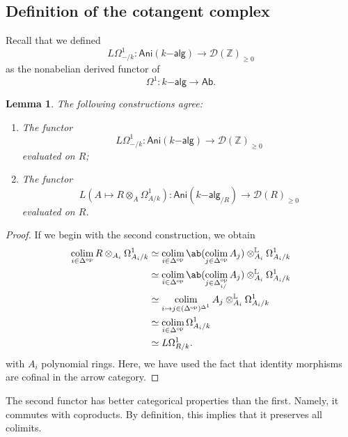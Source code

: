 \documentclass[10pt]{amsart}
\newtheorem{lem}[thm]{Lemma}
\theoremstyle{definition}
\theoremstyle{remark}
\theoremstyle{plain}
\theoremstyle{definition}
\theoremstyle{remark}
\newcommand{\Z}{\mathbb{Z}}
\renewcommand{\L}{\mathbb{L}}
\newcommand{\mc}[1]{\mathcal{#1}}
\newcommand{\ms}[1]{\mathsf{#1}}
\newcommand{\1}{\mathbf{1}}
\newcommand{\2}{\mathbf{2}}
\newcommand{\3}{\mathbf{3}}
\DeclareMathOperator{\op}{op}
\DeclareMathOperator*{\colim}{colim}
\begin{document}
\subsection{Definition of the cotangent complex}%
\label{sub:Definition of the cotangent complex}

Recall that we defined
\[ L \Omega^1_{-/k} \colon \ms{Ani}(k\ms{-alg}) \to \mc{D}(\Z)_{\geq 0} \] as the nonabelian derived functor of
\[ \Omega^1 \colon k\ms{-alg} \to \ms{Ab}. \]

\begin{lem}
    The following constructions agree:
    \begin{enumerate}
        \item The functor 
        \[ L \Omega^1_{-/k} \colon \ms{Ani}(k\ms{-alg}) \to \mc{D}(\Z)_{\geq 0} \] evaluated on $R$;
        \item The functor 
        \[ L (A \mapsto R \otimes_A \Omega^1_{A/k}) \colon \ms{Ani}(k\ms{-alg}_{/R}) \to \mc{D}(R)_{\geq 0} \]
        evaluated on $R$.
    \end{enumerate}
\end{lem}

\begin{proof}
    If we begin with the second construction, we obtain
    \begin{align*}
        \colim_{i \in \Delta^{\op}} R \otimes_{A_i}\Omega^1_{A_i/k} &\simeq \colim_{i \in \Delta^{\op}} \ab(\colim_{j \in \Delta^{\op}} A_j) \otimes^{\L}_{A_i} \Omega^1_{A_i/k} \\
        &\simeq \colim_{i \in \Delta^{\op}} \ab(\colim_{j \in \Delta^{\op}_{i/}} A_j) \otimes_{A_i}^{\L} \Omega^1_{A_i/k} \\
        &\simeq \colim_{i \to j \in (\Delta^{\op})^{\Delta^1}} A_j \otimes_{A_i}^{\L} \Omega^1_{A_i/k} \\
        &\simeq \colim_{i \in \Delta^{\op}} \Omega^1_{A_i/k} \\
        &\simeq L \Omega^1_{R/k}.
    \end{align*}
    with $A_i$ polynomial rings. Here, we have used the fact that identity morphisms are cofinal in the arrow category.
\end{proof}

The second functor has better categorical properties than the first. Namely, it commutes with coproducts. By definition, this implies that it preserves all colimits.
\end{document}
